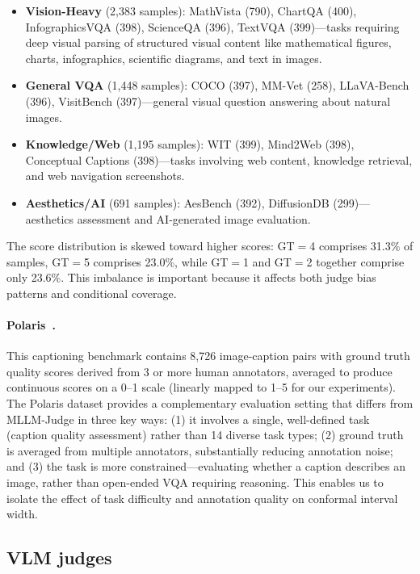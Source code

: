 \documentclass{article}
\begin{document}
\begin{itemize}[leftmargin=*,itemsep=1pt,topsep=2pt]
\item \textbf{Vision-Heavy} (2,383 samples): MathVista (790), ChartQA (400), InfographicsVQA (398), ScienceQA (396), TextVQA (399)---tasks requiring deep visual parsing of structured visual content like mathematical figures, charts, infographics, scientific diagrams, and text in images.
\item \textbf{General VQA} (1,448 samples): COCO (397), MM-Vet (258), LLaVA-Bench (396), VisitBench (397)---general visual question answering about natural images.
\item \textbf{Knowledge/Web} (1,195 samples): WIT (399), Mind2Web (398), Conceptual Captions (398)---tasks involving web content, knowledge retrieval, and web navigation screenshots.
\item \textbf{Aesthetics/AI} (691 samples): AesBench (392), DiffusionDB (299)---aesthetics assessment and AI-generated image evaluation.
\end{itemize}

The score distribution is skewed toward higher scores: GT$=$4 comprises 31.3\% of samples, GT$=$5 comprises 23.0\%, while GT$=$1 and GT$=$2 together comprise only 23.6\%. This imbalance is important because it affects both judge bias patterns and conditional coverage.

\paragraph{Polaris~\citep{wada2024polos}.} This captioning benchmark contains 8,726 image-caption pairs with ground truth quality scores derived from 3 or more human annotators, averaged to produce continuous scores on a 0--1 scale (linearly mapped to 1--5 for our experiments). The Polaris dataset provides a complementary evaluation setting that differs from MLLM-Judge in three key ways: (1) it involves a single, well-defined task (caption quality assessment) rather than 14 diverse task types; (2) ground truth is averaged from multiple annotators, substantially reducing annotation noise; and (3) the task is more constrained---evaluating whether a caption describes an image, rather than open-ended VQA requiring reasoning. This enables us to isolate the effect of task difficulty and annotation quality on conformal interval width.

\subsection{VLM judges}
\label{sec:judges}
\end{document}
